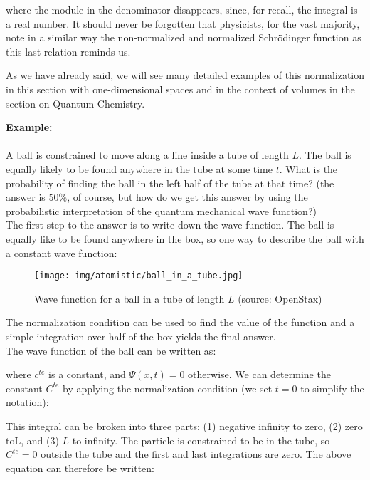 	where the module in the denominator disappears, since, for recall, the integral is a real number. It should never be forgotten that physicists, for the vast majority, note in a similar way the non-normalized and normalized Schrödinger function as this last relation reminds us.
	
	As we have already said, we will see many detailed examples of this normalization in this section with one-dimensional spaces and in the context of volumes in the section on Quantum Chemistry.
	 \begin{tcolorbox}[colframe=black,colback=white,sharp corners]
	\textbf{{\Large {}}Example:}\\\\
	A ball is constrained to move along a line inside a tube of length $L$. The ball is equally likely to be found anywhere in the tube at some time $t$. What is the probability of finding the ball in the left half of the tube at that time? (the answer is $50\%$, of course, but how do we get this answer by using the probabilistic interpretation of the quantum mechanical wave function?)\\
	
	The first step to the answer is to write down the wave function. The ball is equally like to be found anywhere in the box, so one way to describe the ball with a constant wave function:
	\begin{figure}[H]
		\centering
		\texttt{[image: img/atomistic/ball\_in\_a\_tube.jpg]}	
		\caption[Wave function for a ball in a tube of length $L$]{Wave function for a ball in a tube of length $L$ (source: OpenStax)}
	\end{figure}
	The normalization condition can be used to find the value of the function and a simple integration over half of the box yields the final answer.\\
	
	The wave function of the ball can be written as:
	
	where $c^{te}$ is a constant, and  $\Psi(x,t)=0$ otherwise. We can determine the constant $C^{te}$ by applying the normalization condition (we set  $t=0$  to simplify the notation):
	
	This integral can be broken into three parts: (1) negative infinity to zero, (2) zero to$ $L, and (3) $L$ to infinity. The particle is constrained to be in the tube, so $C^{te}=0$ outside the tube and the first and last integrations are zero. The above equation can therefore be written:
	
	\end{tcolorbox}
	
